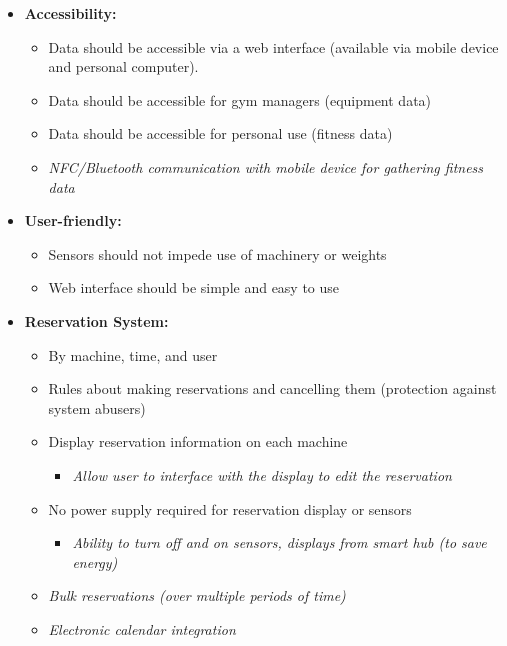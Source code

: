 \documentclass[letterpaper,11pt]{./templates/texMemo} %
\begin{document}
\begin{itemize}
    \item{\textbf{Accessibility:}}
    \begin{itemize}
        \item{Data should be accessible via a web interface (available via mobile device and personal computer).}
        \item{Data should be accessible for gym managers (equipment data)}
        \item{Data should be accessible for personal use (fitness data)}
        \item{\textit{NFC/Bluetooth communication with mobile device for gathering fitness data}}
    \end{itemize}

    \item{\textbf{User-friendly:}}
    \begin{itemize}
        \item{Sensors should not impede use of machinery or weights}
        \item{Web interface should be simple and easy to use}
    \end{itemize}

    \item{\textbf{Reservation System:}}
    \begin{itemize}
        \item{By machine, time, and user}
        \item{Rules about making reservations and cancelling them (protection against system abusers)}
        \item{Display reservation information on each machine}
        \begin{itemize}
            \item{\textit{Allow user to interface with the display to edit the reservation}}
        \end{itemize}
        \item{No power supply required for reservation display or sensors}
        \begin{itemize}
            \item{\textit{Ability to turn off and on sensors, displays from smart hub (to save energy)}}
        \end{itemize}
        \item{\textit{Bulk reservations (over multiple periods of time)}}
        \item{\textit{Electronic calendar integration}}
    \end{itemize}


\end{itemize}
\end{document}
